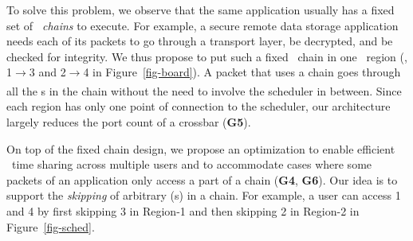 To solve this problem, we observe that the same application usually has a fixed set of {\em \nt\ chains} to execute.
For example, a secure remote data storage application needs each of its packets to go through a transport layer, be decrypted, and be checked for integrity.
We thus propose to put such a fixed \nt\ chain in one \nt\ region (\eg, \nt{}1$\xrightarrow[]{}$\nt{}3 and \nt{}2$\xrightarrow[]{}$\nt{}4 in Figure~\ref{fig-board}).
A packet that uses a chain goes through all the \nt{}s in the chain without the need to involve the scheduler in between.
Since each region has only one point of connection to the scheduler, our architecture largely reduces the port count of a crossbar (\textbf{G5}).


On top of the fixed chain design, we propose an optimization to enable efficient \nt\ time sharing across multiple users and to accommodate cases where some packets of an application only access a part of a chain (\textbf{G4}, \textbf{G6}).
Our idea is to support the {\em skipping} of arbitrary \nt(s) in a chain.
For example, a user can access \nt{}1 and \nt{}4 by first skipping \nt{}3 in Region-1 and then skipping \nt{}2 in Region-2 in Figure~\ref{fig-sched}.


